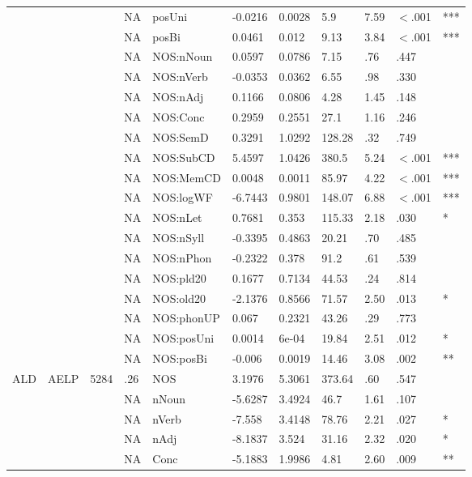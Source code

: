 \begin{table}[ht]
\begin{tabular}{lllllllllll}
   &  &  & NA & posUni & -0.0216 & 0.0028 & 5.9 & 7.59 & $<$.001 & *** \\ 
   &  &  & NA & posBi & 0.0461 & 0.012 & 9.13 & 3.84 & $<$.001 & *** \\ 
   &  &  & NA & NOS:nNoun & 0.0597 & 0.0786 & 7.15 & .76 & .447 &   \\ 
   &  &  & NA & NOS:nVerb & -0.0353 & 0.0362 & 6.55 & .98 & .330 &   \\ 
   &  &  & NA & NOS:nAdj & 0.1166 & 0.0806 & 4.28 & 1.45 & .148 &   \\ 
   &  &  & NA & NOS:Conc & 0.2959 & 0.2551 & 27.1 & 1.16 & .246 &   \\ 
   &  &  & NA & NOS:SemD & 0.3291 & 1.0292 & 128.28 & .32 & .749 &   \\ 
   &  &  & NA & NOS:SubCD & 5.4597 & 1.0426 & 380.5 & 5.24 & $<$.001 & *** \\ 
   &  &  & NA & NOS:MemCD & 0.0048 & 0.0011 & 85.97 & 4.22 & $<$.001 & *** \\ 
   &  &  & NA & NOS:logWF & -6.7443 & 0.9801 & 148.07 & 6.88 & $<$.001 & *** \\ 
   &  &  & NA & NOS:nLet & 0.7681 & 0.353 & 115.33 & 2.18 & .030 & * \\ 
   &  &  & NA & NOS:nSyll & -0.3395 & 0.4863 & 20.21 & .70 & .485 &   \\ 
   &  &  & NA & NOS:nPhon & -0.2322 & 0.378 & 91.2 & .61 & .539 &   \\ 
   &  &  & NA & NOS:pld20 & 0.1677 & 0.7134 & 44.53 & .24 & .814 &   \\ 
   &  &  & NA & NOS:old20 & -2.1376 & 0.8566 & 71.57 & 2.50 & .013 & * \\ 
   &  &  & NA & NOS:phonUP & 0.067 & 0.2321 & 43.26 & .29 & .773 &   \\ 
   &  &  & NA & NOS:posUni & 0.0014 & 6e-04 & 19.84 & 2.51 & .012 & * \\ 
   &  &  & NA & NOS:posBi & -0.006 & 0.0019 & 14.46 & 3.08 & .002 & ** \\ 
  ALD & AELP & 5284 & .26 & NOS & 3.1976 & 5.3061 & 373.64 & .60 & .547 &   \\ 
   &  &  & NA & nNoun & -5.6287 & 3.4924 & 46.7 & 1.61 & .107 &   \\ 
   &  &  & NA & nVerb & -7.558 & 3.4148 & 78.76 & 2.21 & .027 & * \\ 
   &  &  & NA & nAdj & -8.1837 & 3.524 & 31.16 & 2.32 & .020 & * \\ 
   &  &  & NA & Conc & -5.1883 & 1.9986 & 4.81 & 2.60 & .009 & ** \\ 

\end{tabular}
\end{table}
